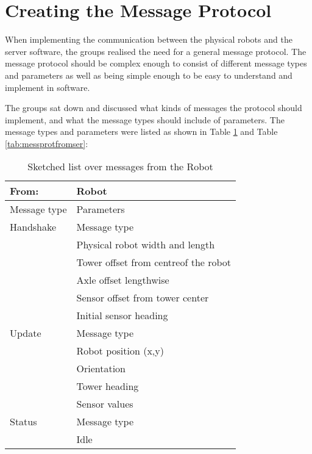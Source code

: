 \section{Creating the Message Protocol}
When implementing the communication between the physical robots and the server software, the groups realised the need for a general message protocol. The message protocol should be complex enough to consist of different message types and parameters as well as being simple enough to be easy to understand and implement in software. 

The groups sat down and discussed what kinds of messages the protocol should implement, and what the message types should include of parameters. The message types and parameters were listed as shown in Table \ref{tab:messprotfromrob} and Table \ref{tab:messprotfromser}:

\begin{table}[ht]
\begin{center}
 \begin{tabular}{|l | l|} 
 \hline
 From: & \textbf{Robot}\\
 \hline
 \hline
 Message type       &    Parameters \\
 \hline

 Handshake          &   Message type \\
                     &    Physical robot width and length  \\
                    &   Tower offset from centreof the robot\\
                    &    Axle offset lengthwise \\
                    &    Sensor offset from tower center \\
                    &    Initial sensor heading \\
 \hline
 Update              &   Message type \\
                    &   Robot position (x,y) \\
                    &   Orientation \\
                    &   Tower heading \\
                    &    Sensor values \\
 \hline
 Status                &   Message type \\
                     &    Idle\\
 \hline
 \end{tabular}
\end{center}
\caption{Sketched list over messages from the Robot}
\label{tab:messprotfromrob}
\end{table}

